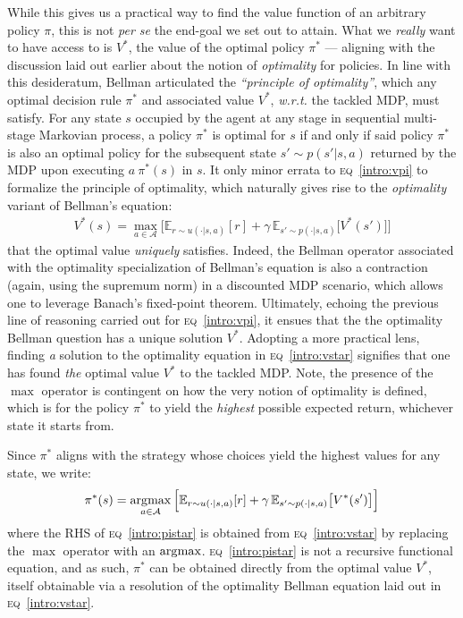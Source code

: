 While this gives us a practical way to find the value function of an arbitrary policy $\pi$,
this is not \textit{per se} the end-goal we set out to attain.
What we \emph{really} want to have access to is $V^*$, the value of the optimal policy $\pi^*$
--- aligning with the discussion laid out earlier about the notion of \emph{optimality} for policies.
In line with this desideratum,
Bellman articulated the \textit{``principle of optimality''},
which any optimal decision rule $\pi^*$ and associated value $V^*$,
\textit{w.r.t.} the tackled MDP, must satisfy.
For any state $s$ occupied by the agent at any stage in sequential multi-stage Markovian process,
a policy $\pi^*$ is optimal for $s$
if and only if said policy $\pi^*$ is also an optimal policy for the subsequent state $s' \sim p(s'|s,a)$
returned by the MDP upon executing $a ~ \pi^*(s)$ in $s$.
It only minor errata to \textsc{eq}~\ref{intro:vpi} to formalize the principle of optimality,
which naturally gives rise to the \emph{optimality} variant of Bellman's equation:
\begin{align}
V^*(s)
= \max_{a \in \mathcal{A}}
\Big[
\mathbb{E}_{r \sim u(\cdot|s,a)}[r]
+ \gamma \,
\mathbb{E}_{s' \sim p(\cdot|s,a)}\big[V^*(s')\big]
\Big]
\label{intro:vstar}
\end{align}
that the optimal value \emph{uniquely} satisfies. Indeed, the Bellman operator associated with the optimality
specialization of Bellman's equation is also a contraction (again, using the supremum norm) in a discounted MDP
scenario, which allows one to leverage Banach's fixed-point theorem.
Ultimately, echoing the previous line of reasoning carried out for \textsc{eq}~\ref{intro:vpi},
it ensues that the the optimality Bellman question has a unique solution $V^*$.
Adopting a more practical lens, finding \emph{a} solution to the optimality equation in \textsc{eq}~\ref{intro:vstar}
signifies that one has found \emph{the} optimal value $V^*$ to the tackled MDP.
Note, the presence of the $\max$ operator is contingent on how the very notion of optimality is defined,
which is for the policy $\pi^*$ to yield the \emph{highest} possible expected return,
whichever state it starts from.

Since $\pi^*$ aligns with the strategy whose choices yield the highest values for any state, we write:
\begin{align}
\pi^*(s)
= \operatorname*{\arg\!\max}_{a \in \mathcal{A}}
\Big[
\mathbb{E}_{r \sim u(\cdot|s,a)}[r]
+ \gamma \,
\mathbb{E}_{s' \sim p(\cdot|s,a)}\big[V^*(s')\big]
\Big]
\label{intro:pistar}
\end{align}
where the RHS of \textsc{eq}~\ref{intro:pistar}
is obtained from \textsc{eq}~\ref{intro:vstar} by replacing the $\max$ operator with an $\operatorname*{\arg\!\max}$.
\textsc{eq}~\ref{intro:pistar} is not a recursive functional equation, and as such,
$\pi^*$ can be obtained directly from the optimal value $V^*$, itself obtainable via a resolution
of the optimality Bellman equation laid out in \textsc{eq}~\ref{intro:vstar}.

